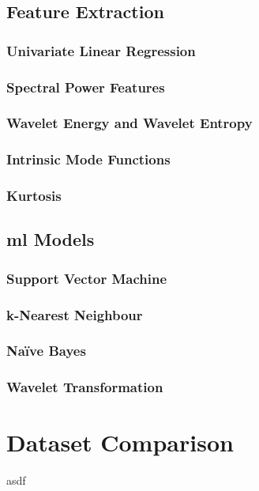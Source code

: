 \documentclass[12pt]{article}
\begin{document}
\subsection{Feature Extraction}

\subsubsection{Univariate Linear Regression}

\subsubsection{Spectral Power Features}

\subsubsection{Wavelet Energy and Wavelet Entropy}

\subsubsection{Intrinsic Mode Functions}

\subsubsection{Kurtosis}



\subsection{\acrfull{ml} Models}

\subsubsection{Support Vector Machine}

\subsubsection{k-Nearest Neighbour}

\subsubsection{Naïve Bayes}

\subsubsection{Wavelet Transformation}



\section{Dataset Comparison}



asdf
\cite{test}

\pagebreak

\printglossary[type=\acronymtype]
\printglossary

\pagebreak



\end{document}
